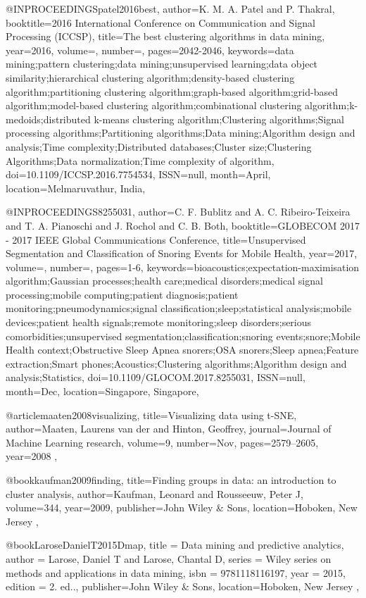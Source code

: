 @INPROCEEDINGS{patel2016best, 
author={K. M. A. {Patel} and P. {Thakral}}, 
booktitle={2016 International Conference on Communication and Signal Processing (ICCSP)}, 
title={The best clustering algorithms in data mining}, 
year={2016}, 
volume={}, 
number={}, 
pages={2042-2046}, 
keywords={data mining;pattern clustering;data mining;unsupervised learning;data object similarity;hierarchical clustering algorithm;density-based clustering algorithm;partitioning clustering algorithm;graph-based algorithm;grid-based algorithm;model-based clustering algorithm;combinational clustering algorithm;k-medoids;distributed k-means clustering algorithm;Clustering algorithms;Signal processing algorithms;Partitioning algorithms;Data mining;Algorithm design and analysis;Time complexity;Distributed databases;Cluster size;Clustering Algorithms;Data normalization;Time complexity of algorithm}, 
doi={10.1109/ICCSP.2016.7754534}, 
ISSN={null}, 
month={April},
location={Melmaruvathur, India},
}

@INPROCEEDINGS{8255031, 
author={C. F. {Bublitz} and A. C. {Ribeiro-Teixeira} and T. A. {Pianoschi} and J. {Rochol} and C. B. {Both}}, 
booktitle={GLOBECOM 2017 - 2017 IEEE Global Communications Conference}, 
title={Unsupervised Segmentation and Classification of Snoring Events for Mobile Health}, 
year={2017}, 
volume={}, 
number={}, 
pages={1-6}, 
keywords={bioacoustics;expectation-maximisation algorithm;Gaussian processes;health care;medical disorders;medical signal processing;mobile computing;patient diagnosis;patient monitoring;pneumodynamics;signal classification;sleep;statistical analysis;mobile devices;patient health signals;remote monitoring;sleep disorders;serious comorbidities;unsupervised segmentation;classification;snoring events;snore;Mobile Health context;Obstructive Sleep Apnea snorers;OSA snorers;Sleep apnea;Feature extraction;Smart phones;Acoustics;Clustering algorithms;Algorithm design and analysis;Statistics}, 
doi={10.1109/GLOCOM.2017.8255031}, 
ISSN={null}, 
month={Dec},
location={Singapore, Singapore}},

@article{maaten2008visualizing,
  title={Visualizing data using t-SNE},
  author={Maaten, Laurens van der and Hinton, Geoffrey},
  journal={Journal of Machine Learning research},
  volume={9},
  number={Nov},
  pages={2579--2605},
  year={2008}
},

@book{kaufman2009finding,
  title={Finding groups in data: an introduction to cluster analysis},
  author={Kaufman, Leonard and Rousseeuw, Peter J},
  volume={344},
  year={2009},
  publisher={John Wiley \& Sons},
  location={Hoboken, New Jersey}
},

@book{LaroseDanielT2015Dmap,
title = {Data mining and predictive analytics},
author = {Larose, Daniel T and Larose, Chantal D},
series = {Wiley series on methods and applications in data mining},
isbn = {9781118116197},
year = {2015},
edition = {2. ed..},
publisher={John Wiley \& Sons},
location={Hoboken, New Jersey}
},








